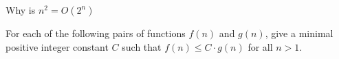 \documentclass[12pt]{exam}
\begin{document}
\begin{questions}
\begin{parts}
\begin{solution}[3in]
\end{solution}

\end{parts}

\question[2] Why is $n^2 = O(2^n)$

\begin{solution}[1in]


\end{solution}

\question[3] For each of the following pairs of functions $f(n)$ and $g(n)$, give a minimal positive integer constant $C$ such that $f(n) \leq C \cdot g(n)$ for all $n>1$.


\end{questions}
\end{document}
